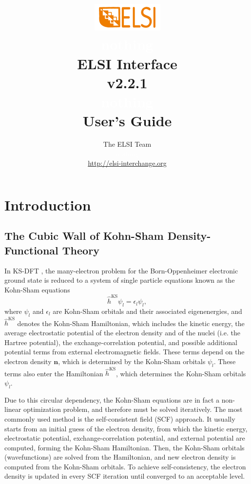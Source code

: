 \documentclass{report}
\begin{document}
\title{\includegraphics[scale=0.07]{elsi_logo.png}\\ \textcolor{white}{nothing}\\ \textbf{ELSI Interface\\ v2.2.1\\ \textcolor{white}{nothing} \\ User's Guide}}
\author{The ELSI Team\\ \textcolor{white}{nothing}\\ \url{http://elsi-interchange.org}}
\maketitle

\tableofcontents

\chapter{Introduction}
\section{The Cubic Wall of Kohn-Sham Density-Functional Theory}
\label{sec:ksdft}
In KS-DFT \cite{ks_kohn_1965}, the many-electron problem for the Born-Oppenheimer electronic ground state is reduced to a system of single particle equations known as the Kohn-Sham equations
\begin{equation}
\label{eq:ks}
\hat{h}^\text{KS} \psi_l = \epsilon_l \psi_l ,
\end{equation}
where $\psi_l$ and $\epsilon_l$ are Kohn-Sham orbitals and their associated eigenenergies, and $\hat{h}^\text{KS}$ denotes the Kohn-Sham Hamiltonian, which includes the kinetic energy, the average electrostatic potential of the electron density and of the nuclei (i.e. the Hartree potential), the exchange-correlation potential, and possible additional potential terms from external electromagnetic fields.  These terms depend on the electron density $\boldsymbol{n}$, which is determined by the Kohn-Sham orbitals $\psi_l$.  These terms also enter the Hamiltonian $\hat{h}^\text{KS}$, which determines the Kohn-Sham orbitals $\psi_l$.

Due to this circular dependency, the Kohn-Sham equations are in fact a non-linear optimization problem, and therefore must be solved iteratively.  The most commonly used method is the self-consistent field (SCF) approach.  It usually starts from an initial guess of the electron density, from which the kinetic energy, electrostatic potential, exchange-correlation potential, and external potential are computed, forming the Kohn-Sham Hamiltonian.  Then, the Kohn-Sham orbitals (wavefunctions) are solved from the Hamiltonian, and new electron density is computed from the Kohn-Sham orbitals.  To achieve self-consistency, the electron density is updated in every SCF iteration until converged to an acceptable level.
\end{document}
